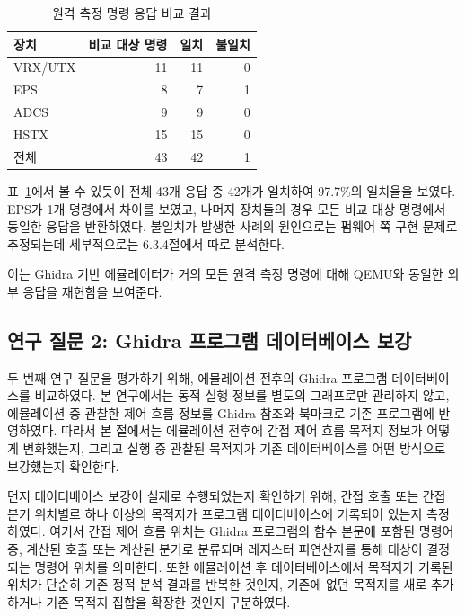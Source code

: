 \documentclass[master,korean,final]{kaist-ucs}
\begin{document}
\begin{table}[t]
\caption{원격 측정 명령 응답 비교 결과}
\label{tab:telemetry-response}
\begin{center}
\begin{tabular}{lrrr}
\hline\hline
장치 & 비교 대상 명령 & 일치 & 불일치 \\
\hline
VRX/UTX & 11 & 11 & 0 \\
EPS & 8 & 7 & 1 \\
ADCS & 9 & 9 & 0 \\
HSTX & 15 & 15 & 0 \\
\hline
전체 & 43 & 42 & 1 \\
\hline\hline
\end{tabular}
\end{center}
\end{table}

표~\ref{tab:telemetry-response}에서 볼 수 있듯이 전체 43개 응답 중 42개가 일치하여 97.7\%의 일치율을 보였다. EPS가 1개 명령에서 차이를 보였고, 나머지 장치들의 경우 모든 비교 대상 명령에서 동일한 응답을 반환하였다. 불일치가 발생한 사례의 원인으로는 펌웨어 쪽 구현 문제로 추정되는데 세부적으로는 6.3.4절에서 따로 분석한다.

이는 Ghidra 기반 에뮬레이터가 거의 모든 원격 측정 명령에 대해 QEMU와 동일한 외부 응답을 재현함을 보여준다.

\subsection{연구 질문 2: Ghidra 프로그램 데이터베이스 보강}

두 번째 연구 질문을 평가하기 위해, 에뮬레이션 전후의 Ghidra 프로그램 데이터베이스를 비교하였다. 본 연구에서는 동적 실행 정보를 별도의 그래프로만 관리하지 않고, 에뮬레이션 중 관찰한 제어 흐름 정보를 Ghidra 참조와 북마크로 기존 프로그램에 반영하였다. 따라서 본 절에서는 에뮬레이션 전후에 간접 제어 흐름 목적지 정보가 어떻게 변화했는지, 그리고 실행 중 관찰된 목적지가 기존 데이터베이스를 어떤 방식으로 보강했는지 확인한다.

먼저 데이터베이스 보강이 실제로 수행되었는지 확인하기 위해, 간접 호출 또는 간접 분기 위치별로 하나 이상의 목적지가 프로그램 데이터베이스에 기록되어 있는지 측정하였다. 여기서 간접 제어 흐름 위치는 Ghidra 프로그램의 함수 본문에 포함된 명령어 중, 계산된 호출 또는 계산된 분기로 분류되며 레지스터 피연산자를 통해 대상이 결정되는 명령어 위치를 의미한다. 또한 에뮬레이션 후 데이터베이스에서 목적지가 기록된 위치가 단순히 기존 정적 분석 결과를 반복한 것인지, 기존에 없던 목적지를 새로 추가하거나 기존 목적지 집합을 확장한 것인지 구분하였다.
\end{document}
